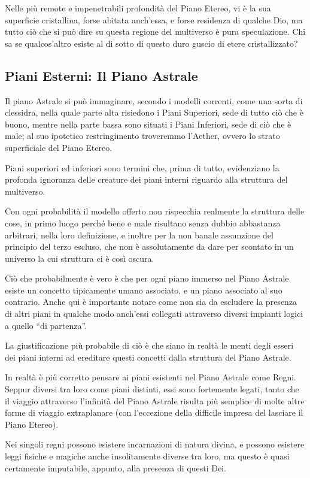 Nelle più remote e impenetrabili profondità del Piano Etereo, vi è la sua superficie cristallina, forse abitata anch’essa, e forse residenza di qualche Dio, ma tutto ciò che si può dire su questa regione del multiverso è pura speculazione.
Chi sa se qualcos’altro esiste al di sotto di questo duro guscio di etere cristallizzato?

\subsection{Piani Esterni: Il Piano Astrale}
Il piano Astrale si può immaginare, secondo i modelli correnti, come una sorta di clessidra, nella quale parte alta risiedono i Piani Superiori, sede di tutto ciò che è buono, mentre nella parte bassa sono situati i Piani Inferiori, sede di ciò che è male; al suo ipotetico restringimento troveremmo l’Aether, ovvero lo strato superficiale del Piano Etereo.

Piani superiori ed inferiori sono termini che, prima di tutto, evidenziano la profonda ignoranza delle creature dei piani interni riguardo alla struttura del multiverso.

Con ogni probabilità il modello offerto non rispecchia realmente la struttura delle cose, in primo luogo perché bene e male risultano senza dubbio abbastanza arbitrari, nella loro definizione, e inoltre per la non banale assunzione del principio del terzo escluso, che non è assolutamente da dare per scontato in un universo la cui struttura ci è così oscura.

Ciò che probabilmente è vero è che per ogni piano immerso nel Piano Astrale esiste un concetto tipicamente umano associato, e un piano associato al suo contrario. Anche qui è importante notare come non sia da escludere la presenza di altri piani in qualche modo anch’essi collegati attraverso diversi impianti logici a quello “di partenza”.

La giustificazione più probabile di ciò è che siano in realtà le menti degli esseri dei piani interni ad ereditare questi concetti dalla struttura del Piano Astrale.

In realtà è più corretto pensare ai piani esistenti nel Piano Astrale come Regni. Seppur diversi tra loro come piani distinti, essi sono fortemente legati, tanto che il viaggio attraverso l’infinità del Piano Astrale risulta più semplice di molte altre forme di viaggio extraplanare (con l’eccezione della difficile impresa del lasciare il Piano Etereo).

Nei singoli regni possono esistere incarnazioni di natura divina, e possono esistere leggi fisiche e magiche anche insolitamente diverse tra loro, ma questo è quasi certamente imputabile, appunto, alla presenza di questi Dei.

